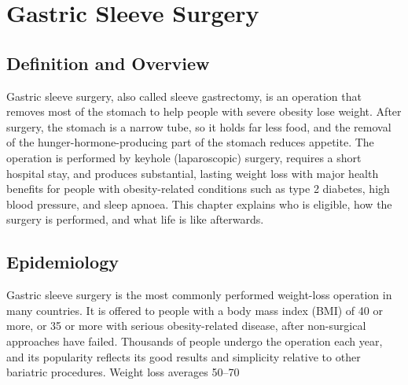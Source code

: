 \chapter{Gastric Sleeve Surgery}

\section*{Definition and Overview}
Gastric sleeve surgery, also called sleeve gastrectomy, is an operation that removes most of the stomach to help people with severe obesity lose weight. After surgery, the stomach is a narrow tube, so it holds far less food, and the removal of the hunger-hormone-producing part of the stomach reduces appetite. The operation is performed by keyhole (laparoscopic) surgery, requires a short hospital stay, and produces substantial, lasting weight loss with major health benefits for people with obesity-related conditions such as type 2 diabetes, high blood pressure, and sleep apnoea. This chapter explains who is eligible, how the surgery is performed, and what life is like afterwards.

\section*{Epidemiology}
Gastric sleeve surgery is the most commonly performed weight-loss operation in many countries. It is offered to people with a body mass index (BMI) of 40 or more, or 35 or more with serious obesity-related disease, after non-surgical approaches have failed. Thousands of people undergo the operation each year, and its popularity reflects its good results and simplicity relative to other bariatric procedures. Weight loss averages 50--70%

